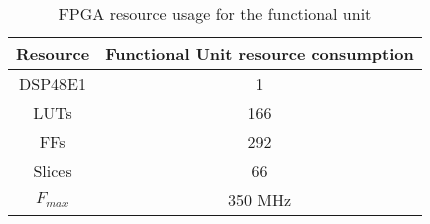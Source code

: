 \begin{table}[b]
	\renewcommand{\arraystretch}{1.3}
	\caption{FPGA resource usage for the functional unit}
	\label{resource_component}
	\scriptsize
	\centering
	\begin{tabular}{cc}
	\toprule
	Resource	& Functional Unit resource consumption		\\
	\midrule		
	DSP48E1		& 1			\\
	LUTs		& 166		\\
	FFs			& 292		\\
	Slices		& 66		\\		
	\hline	
	$F_{\mathit{max}}$		& 350 MHz		\\		
	\bottomrule	
	\end{tabular}
\end{table}

